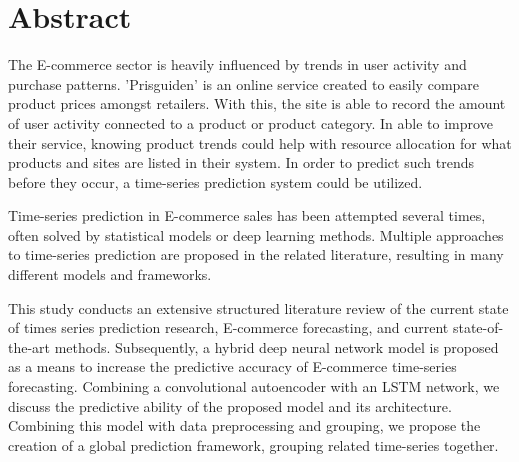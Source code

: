\section*{Abstract}
\label{section:Abstract}

The E-commerce sector is heavily influenced by trends in user activity and purchase patterns.
'Prisguiden' is an online service created to easily compare product prices amongst retailers.
With this, the site is able to record the amount of user activity connected to a product or product category.
In able to improve their service, knowing product trends could help with resource allocation for what products and sites are listed in their system.
In order to predict such trends before they occur, a time-series prediction system could be utilized.

Time-series prediction in E-commerce sales has been attempted several times,
often solved by statistical models or deep learning methods.
Multiple approaches to time-series prediction are proposed in the related literature,
resulting in many different models and frameworks.

This study conducts an extensive structured literature review of the current state of times series prediction research, E-commerce forecasting,
and current state-of-the-art methods.
Subsequently, a hybrid deep neural network model is proposed as a means to increase the predictive accuracy of E-commerce time-series forecasting.
Combining a convolutional autoencoder with an LSTM network, we discuss the predictive ability of the proposed model
and its architecture.
Combining this model with data preprocessing and grouping, we propose the creation of a global prediction framework,
grouping related time-series together.




\iffalse
  This paper provides a template for writing AI project rapports for either the AI specialization project; masters "datateknikk" or masters "informatikk". The use of the template is recommended and is written in english as we encourage students to submit their project and masters theses in English.
  The template does not form a compulsory style that you are obliged to use. However, the format and contents are a result of a joint AI group initiative thus providing a common starting point for all AI students. For a given project tuning of the template may still be required. Such tuning might involve moving a chapter to a section or vice versa due to the nature of the project.

  The abstract is your sales pitch which encourages people to read your work but unlike sales it should be realistic with respect to the contributions of the work. It should include:
  \begin{itemize}
    \item the field of research
    \item a brief motivation for the work
    \item what the research topic is and
    \item the research approach(es) applied.
    \item contributions
  \end{itemize}

  The abstract length should be roughly half a page of text --- without lists, tables or figures.
\fi
